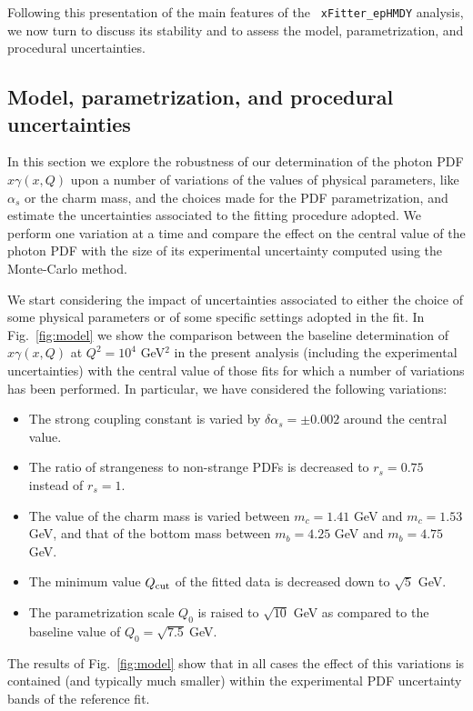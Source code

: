 Following this presentation of the main features of the {\tt
  xFitter\_epHMDY} analysis, we now turn to discuss its stability and
to assess the model, parametrization, and procedural uncertainties.

\subsection{Model, parametrization, and procedural uncertainties}

In this section we explore the robustness of our determination of the
photon PDF $x\gamma(x,Q)$ upon a number of variations of the values of
physical parameters, like $\alpha_s$ or the charm mass, and the
choices made for the PDF parametrization, and estimate the
uncertainties associated to the fitting procedure adopted.
%
We perform one variation at a time and compare the effect on the
central value of the photon PDF with the size of its experimental
uncertainty computed using the Monte-Carlo method.

We start considering the impact of uncertainties associated to either
the choice of some physical parameters or of some specific settings
adopted in the fit.
%
In Fig.~\ref{fig:model} we show the comparison between the baseline
determination of $x\gamma(x,Q)$ at $Q^2=10^4$ GeV$^2$ in the present
analysis (including the experimental uncertainties) with the central
value of those fits for which a number of variations has been
performed.
%
In particular, we have considered the following variations:
\begin{itemize}
\item The strong coupling constant is varied by $\delta \alpha_s=\pm 0.002$ around the central value.
\item The ratio of strangeness to non-strange PDFs is decreased to $r_s=0.75$ instead of $r_s=1$.
\item The value of the charm mass is varied between $m_c=1.41$ GeV and $m_c=1.53$ GeV,
  and that of the bottom mass between $m_b=4.25$ GeV and $m_b=4.75$ GeV.
\item The minimum value $Q_{\rm cut}$ of the fitted data is decreased down to $\sqrt{5}$ GeV.
\item The parametrization scale $Q_0$ is raised to $\sqrt{10}$ GeV as compared
  to the baseline value of $Q_0=\sqrt{7.5}~$GeV.
\end{itemize}
The results of Fig.~\ref{fig:model} show that in all cases the effect
of this variations is contained (and typically much smaller) within
the experimental PDF uncertainty bands of the reference fit.

